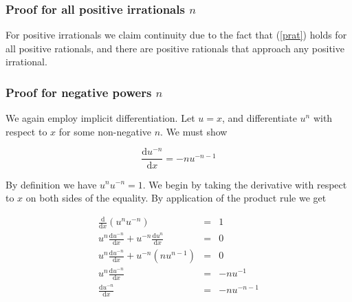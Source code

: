 \documentclass[12pt]{article}
\newcommand{\D}[1]{\ensuremath{\mathrm{d}#1}}
\newcommand{\DDX}{\ensuremath{\frac{\D{}}{\D{x}}}}
\begin{document}
\subsubsection*{Proof for all positive irrationals $n$}

For positive irrationals we claim continuity due to the fact that (\ref{prat})
holds for all positive rationals, and there are positive rationals that approach any positive irrational.

\subsubsection*{Proof for negative powers $n$}

We again employ implicit differentiation.  Let $u = x$, and differentiate $u^n$ with respect to $x$ for some non-negative $n$.  We must show

\begin{equation}
\frac{\D{u^{-n}}}{\D{x}} = -nu^{-n-1} \label{neg}
\end{equation}

By definition we have $u^nu^{-n} = 1$.
We begin by taking the derivative with respect to $x$ on both sides of the equality.  By application of the product rule we get

\begin{eqnarray*}
\DDX(u^nu^{-n}) & = & 1 \\
u^n\frac{\D{u^{-n}}}{\D{x}} + u^{-n}\frac{\D{u^n}}{\D{x}} & = & 0\, \\
u^n\frac{\D{u^{-n}}}{\D{x}} + u^{-n}(nu^{n-1}) & = & 0\, \\
u^n\frac{\D{u^{-n}}}{\D{x}} & = & -nu^{-1} \\
\frac{\D{u^{-n}}}{\D{x}} & = & -nu^{-n-1}
\end{eqnarray*}
\end{document}
